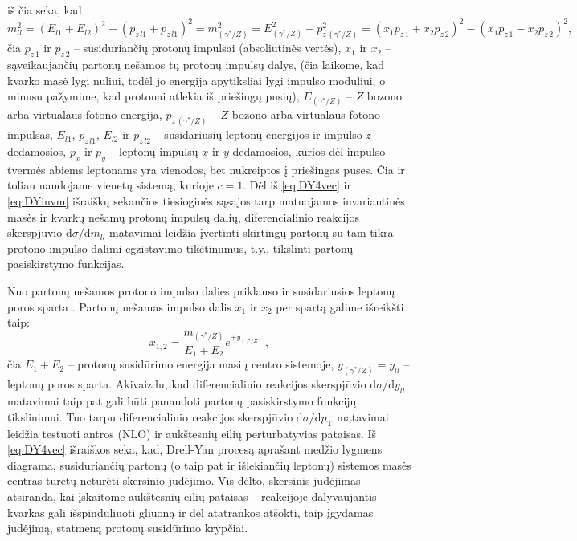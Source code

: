 \documentclass[a4paper, 12pt, oneside]{article}
\newcommand{\pT}{p_{\mathrm{T}}}
\newlength\q
\begin{document}
iš čia seka, kad
\begin{equation}
\label{eq:DYinvm}
	m^2_{ll} = (E_{l1}+E_{l2})^2-(p_{z\,l1}+p_{z\,l1})^2 = m^2_{(\gamma^*\!/\!Z)} = E^2_{(\gamma^*\!/\!Z)}-p^2_{z\,(\gamma^*\!/\!Z)} =
	(x_1p_{z\,1}+x_2p_{z\,2})^2-(x_1p_{z\,1}-x_2p_{z\,2})^2 ,
\end{equation}
čia $p_{z\,1}$ ir $p_{z\,2}$ -- susiduriančių protonų impulsai (absoliutinės vertės), $x_1$ ir $x_2$ -- sąveikaujančių partonų nešamos
tų protonų impulsų dalys, (čia laikome, kad kvarko masė lygi nuliui, todėl jo energija apytiksliai lygi impulso moduliui, o minusu
pažymime, kad protonai atlekia iš priešingų pusių), $E_{(\gamma^*\!/\!Z)}$ -- $Z$ bozono arba virtualaus fotono energija,
$p_{z\,(\gamma^*\!/\!Z)}$ -- $Z$ bozono arba virtualaus fotono impulsas, $E_{l1}$, $p_{z\,l1}$, $E_{l2}$ ir $p_{z\,l2}$ -- susidariusių
leptonų energijos ir impulso $z$ dedamosios, $p_{x}$ ir $p_{y}$ -- leptonų impulsų $x$ ir $y$ dedamosios, kurios dėl impulso tvermės
abiems leptonams yra vienodos, bet nukreiptos į priešingas puses.
Čia ir toliau naudojame vienetų sistemą, kurioje $c=1$.
Dėl iš \eqref{eq:DY4vec} ir \eqref{eq:DYinvm} išraiškų sekančios tiesioginės sąsajos tarp matuojamos invariantinės masės ir kvarkų
nešamų protonų impulsų dalių, diferencialinio reakcijos skerspjūvio $\mathrm{d}\sigma/\mathrm{d}m_{ll}$
matavimai leidžia įvertinti skirtingų partonų su tam tikra protono impulso dalimi egzistavimo tikėtinumus,
t.y., tikslinti partonų pasiskirstymo funkcijas.

Nuo partonų nešamos protono impulso dalies priklauso ir susidariusios leptonų poros sparta \cite{DYrapi}.
Partonų nešamas impulso dalis $x_1$ ir $x_2$ per spartą galime išreikšti taip:
\begin{equation}
	x_{1,2} = \frac{m_{(\gamma^*\!/\!Z)}}{E_1+E_2}e^{\pm y_{(\gamma^*\!/\!Z)}} \, ,
\end{equation}
čia $E_1\!+\!E_2$ -- protonų susidūrimo energija masių centro sistemoje, $y_{(\gamma^*\!/\!Z)}\!=\!y_{ll}$ -- leptonų poros sparta.
Akivaizdu, kad diferencialinio reakcijos skerspjūvio $\mathrm{d}\sigma/\mathrm{d}y_{ll}$ matavimai taip pat gali būti
panaudoti partonų pasiskirstymo funkcijų tikslinimui.
Tuo tarpu diferencialinio reakcijos skerspjūvio $\mathrm{d}\sigma/\mathrm{d}\pT$ matavimai leidžia testuoti antros (NLO) ir
aukštesnių eilių perturbatyvias pataisas.
Iš \eqref{eq:DY4vec} išraiškos seka, kad, Drell-Yan procesą aprašant medžio lygmens diagrama, susiduriančių partonų
(o taip pat ir išlekiančių leptonų) sistemos masės centras turėtų neturėti skersinio judėjimo.
Vis dėlto, skersinis judėjimas atsiranda, kai įskaitome aukštesnių eilių pataisas -- reakcijoje dalyvaujantis kvarkas gali išspinduliuoti
gliuoną ir dėl atatrankos atšokti, taip įgydamas judėjimą, statmeną protonų susidūrimo krypčiai.
\end{document}
